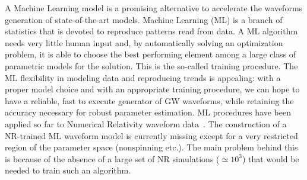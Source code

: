 A Machine Learning model is a promising alternative to accelerate the
waveforms generation of state-of-the-art models.
Machine Learning (ML) is a branch of statistics that is devoted to reproduce patterns read from data. 
A ML algorithm needs very little human input and, by automatically solving an optimization problem, 
it is able to choose the best performing element among a large  class of parametric models for the solution. 
This is the so-called training procedure. 
The ML flexibility in modeling data and reproducing trends is appealing: with a proper model choice 
and with an appropriate training procedure, we can hope to have a reliable, fast to execute generator 
of GW waveforms, while retaining the accuracy necessary for robust parameter estimation. 
ML procedures have been applied so far to Numerical Relativity 
waveform
data~\cite{Gabbard:2017lja,George:2017pmj,George:2017vlv,Rebei:2018lzh,Khan:2020foe}.
%
%
The construction of a NR-trained ML waveform model is currently missing except for a very 
restricted region of the parameter space (nonspinning etc.). The main problem behind this is 
because of the absence of a large set of NR simulations ($\simeq 10^{3}$) that would be 
needed to train such an algorithm.

